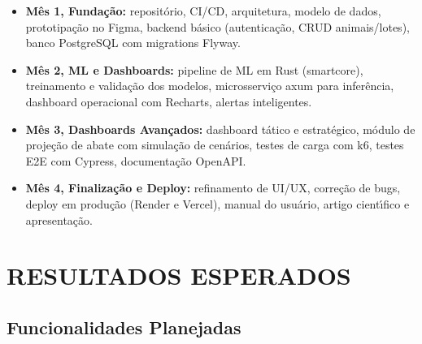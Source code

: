 \documentclass[12pt,a4paper]{article}
\begin{document}
\begin{itemize}[leftmargin=*]
\item \textbf{M\^es 1, Funda\c c\~ao:} reposit\'orio, CI/CD, arquitetura, modelo de dados, prototipa\c c\~ao no Figma, backend b\'asico (autentica\c c\~ao, CRUD animais/lotes), banco PostgreSQL com migrations Flyway.
\item \textbf{M\^es 2, ML e Dashboards:} pipeline de ML em Rust (smartcore), treinamento e valida\c c\~ao dos modelos, microsservi\c co axum para infer\^encia, dashboard operacional com Recharts, alertas inteligentes.
\item \textbf{M\^es 3, Dashboards Avan\c cados:} dashboard t\'atico e estrat\'egico, m\'odulo de proje\c c\~ao de abate com simula\c c\~ao de cen\'arios, testes de carga com k6, testes E2E com Cypress, documenta\c c\~ao OpenAPI.
\item \textbf{M\^es 4, Finaliza\c c\~ao e Deploy:} refinamento de UI/UX, corre\c c\~ao de bugs, deploy em produ\c c\~ao (Render e Vercel), manual do usu\'ario, artigo cient\'{\i}fico e apresenta\c c\~ao.
\end{itemize}

\section{RESULTADOS ESPERADOS}

\subsection{Funcionalidades Planejadas}
\end{document}
